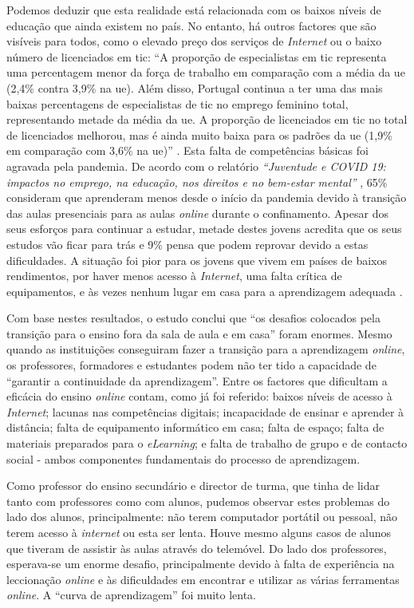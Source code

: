 Podemos deduzir que esta realidade está relacionada com os baixos níveis de educação que ainda existem no país. No entanto, há outros factores que são visíveis para todos, como o elevado preço dos serviços de \textit{Internet} ou o baixo número de licenciados em \acrshort{tic}: ``A proporção de especialistas em \acrshort{tic} representa uma percentagem menor da força de trabalho em comparação com a média da \acrshort{ue} (2,4\% contra 3,9\% na \acrshort{ue}). Além disso, Portugal continua a ter uma das mais baixas percentagens de especialistas de \acrshort{tic} no emprego feminino total, representando metade da média da \acrshort{ue}. A proporção de licenciados em \acrshort{tic} no total de licenciados melhorou, mas é ainda muito baixa para os padrões da \acrshort{ue} (1,9\% em comparação com 3,6\% na \acrshort{ue})'' \cite{DESI2020}.
Esta falta de competências básicas foi agravada pela pandemia. De acordo com o relatório \textit{``Juventude e COVID 19: impactos no emprego, na educação, nos direitos e no bem-estar mental''} \cite{impactocovideducacao}, 65\% consideram que aprenderam menos desde o início da pandemia devido à transição das aulas presenciais para as aulas \textit{online} durante o confinamento. Apesar dos seus esforços para continuar a estudar, metade destes jovens acredita que os seus estudos vão ficar para trás e 9\% pensa que podem reprovar devido a estas dificuldades. A situação foi pior para os jovens que vivem em países de baixos rendimentos, por haver menos acesso à \textit{Internet}, uma falta crítica de equipamentos, e às vezes nenhum lugar em casa para a aprendizagem adequada \cite{impactocovideducacao}.

Com base nestes resultados, o estudo conclui que ``os desafios colocados pela transição para o ensino fora da sala de aula e em casa'' foram enormes. Mesmo quando as instituições conseguiram fazer a transição para a aprendizagem \textit{online}, os professores, formadores e estudantes podem não ter tido a capacidade de ``garantir a continuidade da aprendizagem''. Entre os factores que dificultam a eficácia do ensino \textit{online} contam, como já foi referido: baixos níveis de acesso à \textit{Internet}; lacunas nas competências digitais; incapacidade de ensinar e aprender à distância; falta de equipamento informático em casa; falta de espaço; falta de materiais preparados para o \textit{eLearning}; e falta de trabalho de grupo e de contacto social - ambos componentes fundamentais do processo de aprendizagem.

Como professor do ensino secundário e director de turma, que tinha de lidar tanto com professores como com alunos, pudemos observar estes problemas do lado dos alunos, principalmente: não terem computador portátil ou pessoal, não terem acesso à \textit{internet} ou esta ser lenta. Houve mesmo alguns casos de alunos que tiveram de assistir às aulas através do telemóvel. Do lado dos professores, esperava-se um enorme desafio, principalmente devido à falta de experiência na leccionação \textit{online} e às dificuldades em encontrar e utilizar as várias ferramentas \textit{online}. A ``curva de aprendizagem'' foi muito lenta.


